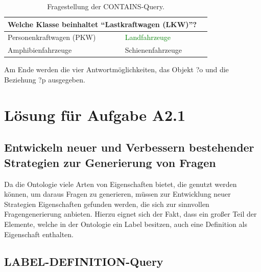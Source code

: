 \documentclass[headsepline,titlepage,ngerman,twoside,12pt]{report}
\begin{document}
\begin{table}
\begin{centering}
\begin{tabularx}{\textwidth}{XXX}
\toprule
\multicolumn{2}{p{0.97\textwidth}}{Welche Klasse beinhaltet \enquote{Lastkraftwagen (LKW)}?}\\
\midrule
Personenkraftwagen (PKW)	&\textcolor{green}{Landfahrzeuge}\\
Amphibienfahrzeuge			&Schienenfahrzeuge\\
\bottomrule
\end{tabularx}
\end{centering}
\caption{Fragestellung der CONTAINS-Query.}
\label{tab:sparqcontainsexample}
\end{table}



Am Ende werden die vier Antwortmöglichkeiten, das Objekt ?o und die Beziehung ?p ausgegeben.

\section{Lösung für Aufgabe A2.1}
\subsection{Entwickeln neuer und Verbessern bestehender Strategien zur Generierung von Fragen}

Da die Ontologie viele Arten von Eigenschaften bietet, die genutzt werden können, um daraus Fragen zu generieren, müssen zur Entwicklung neuer Strategien Eigenschaften gefunden werden, die sich zur sinnvollen Fragengenerierung anbieten.
Hierzu eignet sich der Fakt, dass ein großer Teil der Elemente, welche in der Ontologie ein Label besitzen, auch eine Definition als Eigenschaft enthalten.

\subsection{LABEL-DEFINITION-Query}
\end{document}
